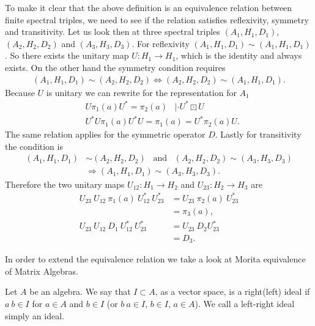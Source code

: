 To make it clear that the above definition is an equivalence relation between
finite spectral triples, we need to see if the relation satisfies
reflexivity, symmetry and transitivity. Let us look then at three spectral
triples $(A_1, H_1, D_1)$, $(A_2, H_2, D_2)$ and $(A_3, H_3, D_3)$.
For reflexivity $(A_1, H_1, D_1) \sim (A_1, H_1, D_1)$. So there
exists the unitary map $U: H_1 \rightarrow H_1$, which is the identity
and always exists. On the other hand the symmetry condition requires
\begin{align}
    (A_1, H_1, D_1) \sim (A_2, H_2, D_2) \Leftrightarrow
    (A_2, H_2, D_2) \sim (A_1, H_1, D_1).
\end{align}
Because $U$ is unitary we can rewrite for the representation for $A_1$
\begin{align}
    &U\pi_1(a)U^* = \pi_2(a) \;\;\; | \cdot U^*\boxdot U\nonumber \\
    &U^*U\pi_1(a)U^*U = \pi_1(a) = U^*\pi_2(a)U.
\end{align}
The same relation applies for the symmetric operator $D$.
Lastly for transitivity the condition is
\begin{align}
    (A_1, H_1, D_1) &\sim (A_2, H_2, D_2) \;\;\; \text{and} \;\;\;
    (A_2, H_2, D_2) \sim (A_3, H_3, D_3) \nonumber\\
    &\Rightarrow (A_1, H_1, D_1) \sim (A_3, H_3, D_3).
\end{align}
Therefore the two unitary maps $U_{12}:H_1 \rightarrow H_2$ and
$U_{23}: H_2 \rightarrow H_3$ are
\begin{align}
    U_{23}\ U_{12}\ \pi_1(a)\ U^*_{12}\ U^*_{23} &= U_{23}\
    \pi_2(a)\ U_{23}^*\nonumber \\
    &= \pi_3(a), \\
    U_{23}\ U_{12}\ D_1\ U^*_{12}\ U^*_{23} &= U_{23}\
    D_2 U_{23}^* \nonumber\\
    &= D_3.
\end{align}

In order to extend the equivalence relation we take a look at Morita
equivalence of Matrix Algebras.
\begin{mydefinition}
    Let $A$ be an algebra. We say that $I \subset A$, as a vector space, is a
    right(left) ideal if $a\ b \in I$ for $a \in A$ and $b\in I$ (or $b\ a \in
    I$, $b\in I$, $a\in A$). We call a left-right ideal simply an ideal.
\end{mydefinition}


